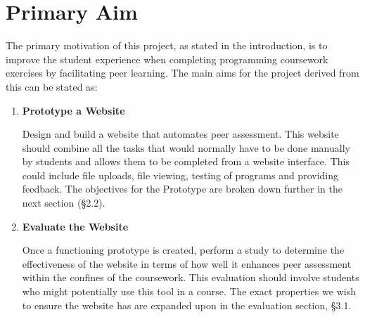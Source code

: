 \documentclass[a4paper,11pt]{report}
\begin{document}
\section{Primary Aim}
The primary motivation of this project, as stated in the introduction, is to improve the student experience when completing programming coursework exercises by facilitating peer learning. The main aims for the project derived from this can be stated as:
\begin{enumerate}
\item \textbf{Prototype a Website}\par
Design and build a website that automates peer assessment. This website should combine all the tasks that would normally have to be done manually by students and allows them to be completed from a website interface. This could include file uploads, file viewing, testing of programs and providing feedback. The objectives for the Prototype are broken down further in the next section (\S2.2).
\item \textbf{Evaluate the Website}\par
Once a functioning prototype is created, perform a study to determine the effectiveness of the website in terms of how well it enhances peer assessment within the confines of the coursework. This evaluation should involve students who might potentially use this tool in a course. The exact properties we wish to ensure the website has are expanded upon in the evaluation section, \S3.1.
\end{enumerate}
\end{document}
